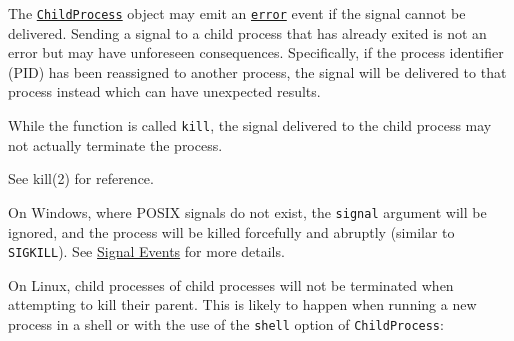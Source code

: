 \begin{Shaded}
\begin{Highlighting}[]
\OperatorTok{=} \NormalTok{(}\NormalTok{)}\OperatorTok{;}
\OperatorTok{=} \NormalTok{(}\OperatorTok{,}\NormalTok{ [}\NormalTok{])}\OperatorTok{;}

\NormalTok{(}\OperatorTok{,}\OperatorTok{,}\KeywordTok{=\textgreater{}}\NormalTok{ \{}
  \NormalTok{(}
    \SpecialCharTok{$\{}\SpecialCharTok{\}}\VerbatimStringTok{\textasciigrave{}}\NormalTok{)}\OperatorTok{;}
\NormalTok{\})}\OperatorTok{;}

\NormalTok{(}\NormalTok{)}\OperatorTok{;}
\end{Highlighting}
\end{Shaded}

The \hyperref[class-childprocess]{\texttt{ChildProcess}} object may emit
an
\hyperref[event-error]{\texttt{\textquotesingle{}error\textquotesingle{}}}
event if the signal cannot be delivered. Sending a signal to a child
process that has already exited is not an error but may have unforeseen
consequences. Specifically, if the process identifier (PID) has been
reassigned to another process, the signal will be delivered to that
process instead which can have unexpected results.

While the function is called \texttt{kill}, the signal delivered to the
child process may not actually terminate the process.

See kill(2) for reference.

On Windows, where POSIX signals do not exist, the \texttt{signal}
argument will be ignored, and the process will be killed forcefully and
abruptly (similar to
\texttt{\textquotesingle{}SIGKILL\textquotesingle{}}). See
\href{process.md\#signal-events}{Signal Events} for more details.

On Linux, child processes of child processes will not be terminated when
attempting to kill their parent. This is likely to happen when running a
new process in a shell or with the use of the \texttt{shell} option of
\texttt{ChildProcess}:


